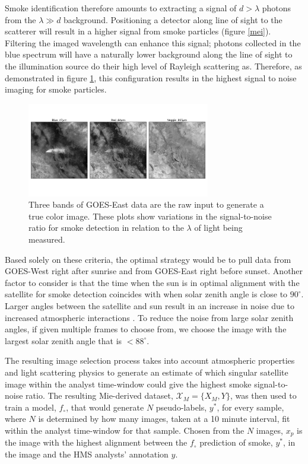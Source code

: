Smoke identification therefore amounts to extracting a signal of \(d > \lambda\) photons from the \(\lambda \gg d\) background. Positioning a detector along line of sight to the scatterer will result in a higher signal from smoke particles (figure \ref{mei}). Filtering the imaged wavelength can enhance this signal; photons collected in the blue spectrum will have a naturally lower background along the line of sight to the illumination source do their high level of Rayleigh scattering as. Therefore, as demonstrated in figure \ref{bands}, this configuration results in the highest signal to noise imaging for smoke particles.

\begin{figure}
    \centering
    \includegraphics[width=8cm]{figures/GOES16_bands.png}
    \caption{Three bands of GOES-East data are the raw input to generate a true color image. These plots show variations in the signal-to-noise ratio for smoke detection in relation to the \(\lambda\) of light being measured.}\label{bands}
\end{figure}

Based solely on these criteria, the optimal strategy would be to pull data from GOES-West right after sunrise and from GOES-East right before sunset. Another factor to consider is that the time when the sun is in optimal alignment with the satellite for smoke detection coincides with when solar zenith angle is close to \(90^{\circ}\). Larger angles between the satellite and sun result in an increase in noise due to increased atmospheric interactions \cite{zen_angle}. To reduce the noise from large solar zenith angles, if given multiple frames to choose from, we choose the image with the largest solar zenith angle that is \(<88^{\circ}\).

The resulting image selection process takes into account atmospheric properties and light scattering physics to generate an estimate of which singular satellite image within the analyst time-window could give the highest smoke signal-to-noise ratio. The resulting Mie-derived dataset, \(\mathcal{X}_M = \{X_M, Y\}\), was then used to train a model, \(f_{\circ}\), that would generate \(N\) pseudo-labels, \(y^*\), for every sample, where \(N\) is determined by how many images, taken at a 10 minute interval, fit within the analyst time-window for that sample. Chosen from the \(N\) images, \(x_p\) is the image with the highest alignment between the \(f_{\circ}\) prediction of smoke, \(y^*\), in the image and the HMS analysts' annotation \(y\).

